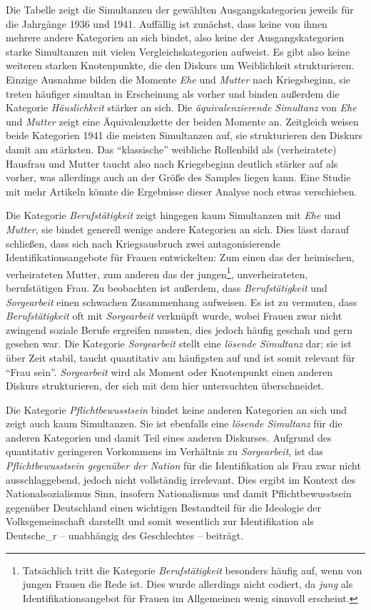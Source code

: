 \documentclass[12pt, titlepage=true, toc=bib]{scrartcl}
\begin{document}
\noindent Die Tabelle zeigt die Simultanzen der gewählten Ausgangskategorien jeweils für die Jahrgänge 1936 und 1941. Auffällig ist zunächst, dass keine von ihnen mehrere andere Kategorien an sich bindet, also keine der Ausgangskategorien starke Simultanzen mit vielen Vergleichskategorien aufweist. Es gibt also keine weiteren starken Knotenpunkte, die den Diskurs um Weiblichkeit strukturieren. Einzige Ausnahme bilden die Momente \textit{Ehe} und \textit{Mutter} nach Kriegsbeginn, sie treten häufiger simultan in Erscheinung als vorher und binden außerdem die Kategorie \textit{Häuslichkeit} stärker an sich. Die \textit{äquivalenzierende Simultanz} von \textit{Ehe} und \textit{Mutter} zeigt eine Äquivalenzkette der beiden Momente an. Zeitgleich weisen beide Kategorien 1941 die meisten Simultanzen auf, sie strukturieren den Diskurs damit am stärksten. Das "`klassische"' weibliche Rollenbild als (verheiratete) Hausfrau und Mutter taucht also nach Kriegsbeginn deutlich stärker auf als vorher, was allerdings auch an der Größe des Samples liegen kann. Eine Studie mit mehr Artikeln könnte die Ergebnisse dieser Analyse noch etwas verschieben.

Die Kategorie \textit{Berufstätigkeit} zeigt hingegen kaum Simultanzen mit \textit{Ehe} und \textit{Mutter}, sie bindet generell wenige andere Kategorien an sich. Dies lässt darauf schließen, dass sich nach Kriegsausbruch zwei antagonisierende Identifikationsangebote für Frauen entwickelten: Zum einen das der heimischen, verheirateten Mutter, zum anderen das der jungen\footnote{Tatsächlich tritt die Kategorie \textit{Berufstätigkeit} besonders häufig auf, wenn von jungen Frauen die Rede ist. Dies wurde allerdings nicht codiert, da \textit{jung} als Identifikationsangebot für Frauen im Allgemeinen wenig sinnvoll erscheint.}, unverheirateten, berufstätigen Frau. Zu beobachten ist außerdem, dass \textit{Berufstätigkeit} und \textit{Sorgearbeit} einen schwachen Zusammenhang aufweisen. Es ist zu vermuten, dass \textit{Berufstätigkeit} oft mit \textit{Sorgearbeit} verknüpft wurde, wobei Frauen zwar nicht zwingend soziale Berufe ergreifen mussten, dies jedoch häufig geschah und gern gesehen war. Die Kategorie \textit{Sorgearbeit} stellt eine \textit{lösende Simultanz} dar; sie ist über Zeit stabil, taucht quantitativ am häufigsten auf und ist somit relevant für "`Frau sein"'. \textit{Sorgearbeit} wird als Moment oder Knotenpunkt einen anderen Diskurs strukturieren, der sich mit dem hier untersuchten überschneidet. 

Die Kategorie \textit{Pflichtbewusstsein} bindet keine anderen Kategorien an sich und zeigt auch kaum Simultanzen. Sie ist ebenfalls eine \textit{lösende Simultanz} für die anderen Kategorien und damit Teil eines anderen Diskurses. Aufgrund des quantitativ geringeren Vorkommens im Verhältnis zu \textit{Sorgearbeit}, ist das \textit{Pflichtbewusstsein gegenüber der Nation} für die Identifikation als Frau zwar nicht ausschlaggebend, jedoch nicht vollständig irrelevant. Dies ergibt im Kontext des Nationalsozialismus Sinn, insofern Nationalismus und damit Pflichtbewusstsein gegenüber Deutschland einen wichtigen Bestandteil für die Ideologie der Volksgemeinschaft darstellt und somit wesentlich zur Identifikation als Deutsche\_r -- unabhängig des Geschlechtes -- beiträgt.
\end{document}
